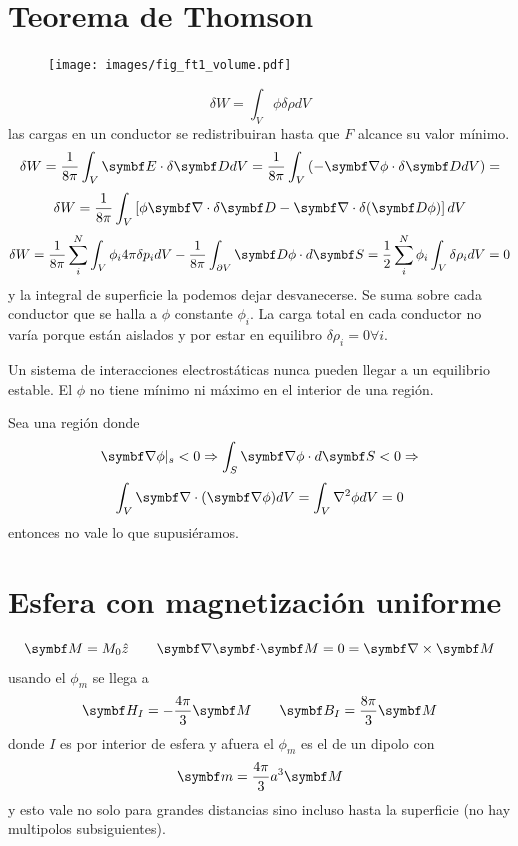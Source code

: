 \documentclass[10pt,oneside]{CBFT_book}
\begin{document}
\section{Teorema de Thomson}

\begin{figure}[htb]
	\begin{center}
	\texttt{[image: images/fig\_ft1\_volume.pdf]}	 
	\end{center}
	\caption{}
\end{figure} 

\[
	\delta W = \int_V \phi \delta \rho dV 
\]
las cargas en un conductor se redistribuiran hasta que $F$ alcance su valor mínimo.
\[
	\delta W = \frac{1}{8\pi} \int_V \vb{E}\cdot\delta\vb{D} dV = \frac{1}{8\pi} \int_V \left( 
-\Nabla\phi\cdot\delta\vb{D}  dV \right)  = 
\]
\[
	\delta W = \frac{1}{8\pi} \int_V \left[ \phi \Nabla\cdot\delta\vb{D} - 
			\Nabla\cdot\delta(\vb{D}\phi) \right] dV
\]
\[
	\delta W = \frac{1}{8\pi} \sum_i^N \int_V \phi_i 4\pi \delta p_i dV - 
		\frac{1}{8\pi} \int_{\partial V} \vb{D}\phi \cdot d\vb{S} =
		\frac{1}{2} \sum_i^N  \phi_i \int_V \delta \rho_i dV = 0
\]
y la integral de superficie la podemos dejar desvanecerse. Se suma sobre cada conductor 
que se halla a $\phi$ constante $\phi_i$.
La carga total en cada conductor no varía porque están aislados y por estar en 
equilibro $\delta \rho_i = 0 \forall i$.

Un sistema de interacciones electrostáticas nunca pueden llegar a un equilibrio estable.
El $\phi$ no tiene mínimo ni máximo en el interior de una región.

Sea una región donde 
\[
	\Nabla\phi |_s < 0 \Rightarrow \int_S \Nabla\phi\cdot d\vb{S} < 0 \Rightarrow
\]
\[
	\int_V \Nabla\cdot(\Nabla\phi) dV = \int_V \nabla^2 \phi dV = 0
\]
entonces no vale lo que supusiéramos.

\section{Esfera con magnetización uniforme}
\[
	\vb{M} = M_0 \hat{z} \qquad \divem{M}= 0 = \rotorm{M}
\]
usando el $\phi_m$ se llega a
\[
	\vb{H}_I = -\frac{4\pi}{3}\vb{M} \qquad \vb{B}_I = \frac{8\pi}{3}\vb{M}
\]
donde $I$ es por interior de esfera y afuera el $\phi_m$ es el de un dipolo con 
\[
	\vb{m} = \frac{4\pi}{3}a^3\vb{M}
\]
y esto vale no solo para grandes distancias sino incluso hasta la superficie (no hay multipolos
subsiguientes).
\end{document}
